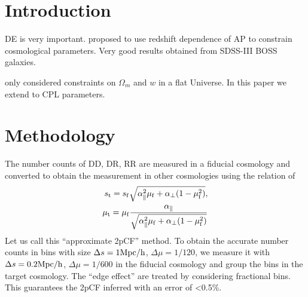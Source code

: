 \documentclass[useAMS,usenatbib]{mnras}
\begin{document}

\section{Introduction}


DE is very important. 
\citep{Li2016} proposed to use redshift dependence of AP to constrain cosmological parameters.
Very good results obtained from SDSS-III BOSS galaxies.

\citep{Li2016} only considered constraints on $\Omega_m$ and $w$ in a flat Universe.
In this paper we extend to CPL parameters.




\section{Methodology}

The number counts of DD, DR, RR are measured in a fiducial cosmology
and converted to obtain the measurement in other cosmologies 
using the relation of
\begin{eqnarray}
 s_{\rm t} = s_{\rm f} \sqrt{\alpha_{\parallel}^2 \mu_{\rm f}+\alpha_{\bot}(1-\mu_{\rm f}^2)}, \\
 \mu_{\rm t} = \mu_{\rm f} \frac{\alpha_\parallel}
 {\sqrt{\alpha_{\parallel}^2 \mu_{\rm f} +\alpha_{\bot}(1-\mu_{\rm f}^2)}}
\end{eqnarray}
Let us call this ``approximate 2pCF'' method.
To obtain the accurate number counts 
in bins with size $\Delta s = 1 {\rm Mpc/h}$, $\Delta \mu = 1/120$,
we measure it with $\Delta s = 0.2 {\rm Mpc/h}$, $\Delta \mu = 1/600$
in the fiducial cosmology and group the bins in the target cosmology.
The ``edge effect'' are treated by considering fractional bins.
This guarantees the 2pCF inferred with an error of <0.5\%.
\end{document}
